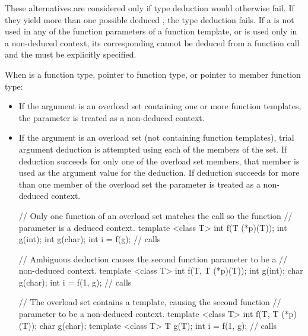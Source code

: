 \pnum
These alternatives are considered only if type deduction would
otherwise fail.
If they yield more than one possible deduced
,
the type deduction fails.
\enternote
If a
is not used in any of the function parameters of a function template,
or is used only in a non-deduced context, its corresponding
cannot be deduced from a function call and the
must be explicitly specified.
\exitnote

\pnum
When
is a function type, pointer to function type, or pointer to member
function type:
\begin{itemize}
\item
If the argument is an overload set containing one or more function templates,
the parameter is treated as a non-deduced context.
\item
If the argument is an overload set (not containing function templates), trial
argument deduction is attempted using each of the members of the set. If
deduction succeeds for only one of the overload set members, that member is
used as the argument value for the deduction. If deduction succeeds for more than
one member of the overload set the parameter is treated as a non-deduced context.

\pnum
\enterexample
\begin{codeblock}
// Only one function of an overload set matches the call so the function
// parameter is a deduced context.
template <class T> int f(T (*p)(T));
int g(int);
int g(char);
int i = f(g);       // calls 
\end{codeblock}
\exitexample

\pnum
\enterexample
\begin{codeblock}
// Ambiguous deduction causes the second function parameter to be a
// non-deduced context.
template <class T> int f(T, T (*p)(T));
int g(int);
char g(char);
int i = f(1, g);    // calls 
\end{codeblock}
\exitexample

\pnum
\enterexample
\begin{codeblock}
// The overload set contains a template, causing the second function
// parameter to be a non-deduced context.
template <class T> int f(T, T (*p)(T));
char g(char);
template <class T> T g(T);
int i = f(1, g);    // calls 
\end{codeblock}
\exitexample
\end{itemize}

